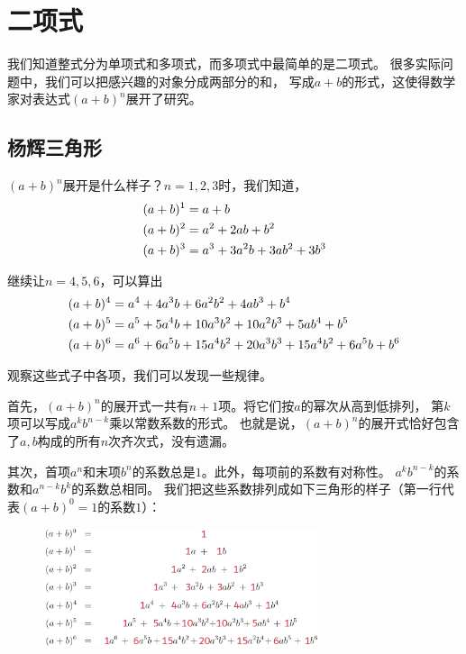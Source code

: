 \documentclass[12pt,UTF8]{ctexbook}
\begin{document}
\chapter{二项式}

我们知道整式分为单项式和多项式，而多项式中最简单的是二项式。
很多实际问题中，我们可以把感兴趣的对象分成两部分的和，
写成$a+b$的形式，这使得数学家对表达式$(a+b)^n$展开了研究。

\section{杨辉三角形}

$(a+b)^n$展开是什么样子？$n=1,2,3$时，我们知道，
\begin{align}
 (a + b)^1 &= a + b \notag \\
 (a + b)^2 &= a^2 + 2ab + b^2 \notag \\
 (a + b)^3 &= a^3 + 3a^2b + 3ab^2 + 3b^3 \notag 
\end{align}

继续让$n=4,5,6$，可以算出
\begin{align}
 (a + b)^4 &= a^4 + 4a^3b + 6a^2b^2 + 4ab^3 + b^4 \notag \\
 (a + b)^5 &= a^5 + 5a^4b + 10a^3b^2 + 10a^2b^3 + 5ab^4 + b^5 \notag \\
 (a + b)^6 &= a^6 + 6a^5b + 15a^4b^2 + 20a^3b^3 + 15a^4b^2 + 6a^5b + b^6 \notag 
\end{align}

观察这些式子中各项，我们可以发现一些规律。

首先，$(a+b)^n$的展开式一共有$n+1$项。将它们按$a$的幂次从高到低排列，
第$k$项可以写成$a^kb^{n-k}$乘以常数系数的形式。
也就是说，$(a+b)^n$的展开式恰好包含了$a,b$构成的所有$n$次齐次式，没有遗漏。

其次，首项$a^n$和末项$b^n$的系数总是$1$。此外，每项前的系数有对称性。
$a^kb^{n-k}$的系数和$a^{n-k}b^k$的系数总相同。
我们把这些系数排列成如下三角形的样子（第一行代表$(a+b)^0=1$的系数$1$）：

\begin{figure}[h] %
    \vspace{-4pt}
    \centering
    \includegraphics[width=0.72\textwidth]{二项式1.png}
\end{figure}
\end{document}
